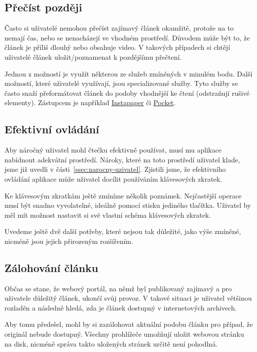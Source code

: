 \subsection{Přečíst později}

Často si uživatelé nemohou přečíst zajímavý článek okamžitě, protože na to nemají čas, nebo se nenacházejí ve vhodném prostředí.
Důvodem může být to, že článek je příliš dlouhý nebo obsahuje video.
V takových případech si chtějí uživatelé článek uložit/poznamenat k pozdějšímu přečtení.

Jednou z možností je využít některou ze služeb zmíněných v minulém bodu.
Další možností, které uživatelé využívají, jsou specializované služby.
Tyto služby se často snaží přeformátovat článek do podoby vhodnější ke čtení (odstraňují rušivé elementy).
Zástupcem je například \href{http://www.instapaper.com/}{Instapaper} či \href{http://getpocket.com/}{Pocket}.

\subsection{Efektivní ovládání}

Aby náročný uživatel mohl čtečku efektivně používat, musí mu aplikace nabídnout adekvátní prostředí.
Nároky, které na toto prostředí uživatel klade, jsme již uvedli v části~\ref{ssec:narocny-uzivatel}.
Zjistili jsme, že efektivního ovládání aplikace může uživatel docílit používáním klávesových zkratek.

Ke klávesovým zkratkám ještě zmíníme několik poznámek.
Nejčastější operace musí být snadno vyvolatelné, ideálně pomocí stisku jediného tlačítka.
Uživatel by měl mít možnost nastavit si své vlastní schéma klávesových zkratek.

\bigskip

Uvedeme ještě dvě další potřeby, které nejsou tak důležité, jako výše zmíněné, nicméně jsou jejich přirozeným rozšířením.

\subsection{Zálohování článku}

Občas se stane, že webový portál, na němž byl publikovaný zajímavý a pro uživatele důležitý článek, ukončí svůj provoz.
V takové situaci je uživatel většinou rozladěn a následně hledá, zda je článek dostupný v internetových archivech.

Aby tomu předešel, mohl by si zazálohovat aktuální podobu článku pro případ, že originál nebude dostupný.
Všechny prohlížeče umožňují uložit webovou stránku na disk, nicméně správa takto uložených stránek určitě není pohodlná.

